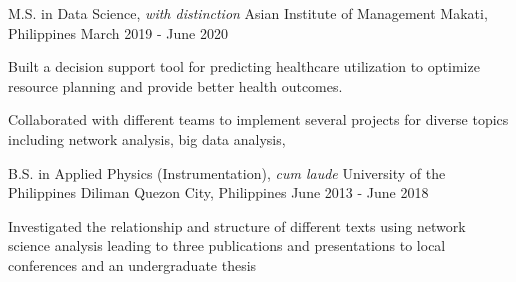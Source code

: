 

\begin{cventries}

  \cventry
    {M.S. in Data Science, \textit{with distinction}} %
    {Asian Institute of Management} %
    {Makati, Philippines} %
    {March 2019 - June 2020} %
    {
      \begin{cvitems} %
        \item{Built a decision support tool for predicting healthcare utilization to optimize resource planning and provide better health outcomes.}
        \item{Collaborated with different teams to implement several projects for diverse topics including network analysis, big data analysis, }
      \end{cvitems}
    }

  \cventry
    {B.S. in Applied Physics (Instrumentation), \textit{cum laude}} %
    {University of the Philippines Diliman} %
    {Quezon City, Philippines} %
    {June 2013 - June 2018} %
    {
      \begin{cvitems} %
        \item{Investigated the relationship and structure of different texts using network
science analysis leading to three publications and presentations to local
conferences and an undergraduate thesis}
      \end{cvitems}
    }
\end{cventries}
